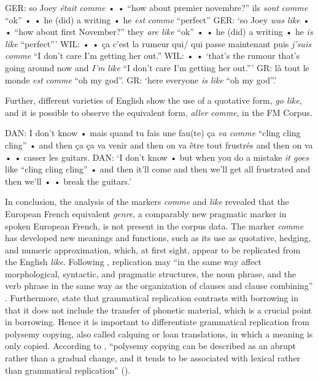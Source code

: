 \documentclass[output=paper]{langscibook}
\begin{document}
\begin{exe}
    \ex\label{hennecke:ex:11} GER: so Joey \textit{était} \textit{comme} • • “how about premier novembre?” ils \textit{sont} \textit{comme} “ok” • • he (did) a writing • he \textit{est} \textit{comme} “perfect”
    \glt GER: ‘so Joey \textit{was like} • • “how about first November?” they \textit{are like} “ok” • • he (did) a writing • he \textit{is like} “perfect”’
    \ex\label{hennecke:ex:12} WIL: • • ça c’est la rumeur qui/ qui passe maintenant puis \textit{j’suis} \textit{comme} “I don’t care I’m getting her out.”
    \glt WIL: • • ‘that’s the rumour that’s going around now and \textit{I’m} \textit{like} “I don’t care I’m getting her out.”’
    \ex\label{hennecke:ex:13} GR: là tout le monde \textit{est} \textit{comme} “oh my god”.
    \glt GR: ‘here everyone \textit{is like} “oh my god”.’
\end{exe}

\noindent
Further, different varieties of English show the use of a quotative form, \textit{go like}, and it is possible to observe the equivalent form, \textit{aller comme}, in the FM Corpus.

\begin{exe}
    \ex\label{hennecke:ex:14} DAN: I don’t know • mais quand tu fais une fau(te) ça \textit{va comme} “cling cling cling” • and then ça ça va venir and then on va être tout frustrés and then on va • • casser les guitars.
    \glt DAN: ‘I don’t know • but when you do a mistake \textit{it goes} like “cling cling cling” • and then it’ll come and then we’ll get all frustrated and then we’ll • • break the guitars.’
\end{exe}


In conclusion, the analysis of the markers \textit{comme} and \textit{like} revealed that the European French equivalent \textit{genre}, a comparably new pragmatic marker in spoken European French, is not present in the corpus data. The marker \textit{comme} has developed new meanings and functions, such as its use as quotative, hedging, and numeric approximation, which, at first sight, appear to be replicated from the English \textit{like}. Following \citet{Heine.2005,Heine.2010}, replication may “in the same way affect morphological, syntactic, and pragmatic structures, the noun phrase, and the verb phrase in the same way as the organization of clauses and clause combining” \citep[261]{Heine.2005}. Furthermore, \citet[89]{Heine.2010} state that grammatical replication contrasts with borrowing in that it does not include the transfer of phonetic material, which is a crucial point in borrowing. Hence it is important to differentiate grammatical replication from polysemy copying, also called calquing or loan translations, in which a meaning is only copied. According to \citeauthor{Heine.2012}, “polysemy copying can be described as an abrupt rather than a gradual change, and it tends to be associated with lexical rather than grammatical replication” (\citeyear[126]{Heine.2012}).
\end{document}
